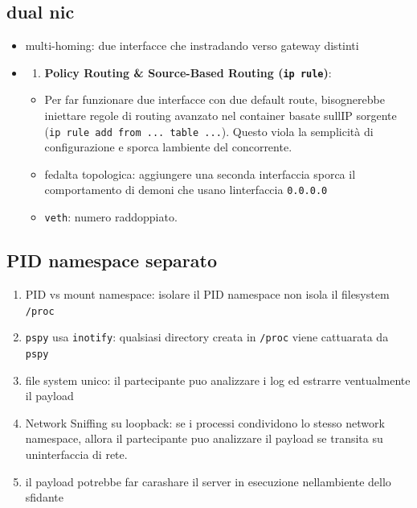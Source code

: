 \subsection{dual nic}\label{dual-nic}

\begin{itemize}
\item
  multi-homing: due interfacce che instradando verso gateway distinti
\item
  \begin{enumerate}
  \def\labelenumi{\arabic{enumi}.}
  \setcounter{enumi}{2}
  \tightlist
  \item
    \textbf{Policy Routing \& Source-Based Routing
    (\passthrough{\lstinline!ip rule!})}:
  \end{enumerate}

  \begin{itemize}
  \tightlist
  \item
    Per far funzionare due interfacce con due default route,
    bisognerebbe iniettare regole di routing avanzato nel container
    basate sull\textquotesingle IP sorgente
    (\passthrough{\lstinline!ip rule add from ... table ...!}). Questo
    viola la semplicità di configurazione e sporca
    l\textquotesingle ambiente del concorrente.
  \item
    fedalta topologica: aggiungere una seconda interfaccia sporca il
    comportamento di demoni che usano l\textquotesingle interfaccia
    \passthrough{\lstinline!0.0.0.0!}
  \item
    \passthrough{\lstinline!veth!}: numero raddoppiato.
  \end{itemize}
\end{itemize}

\subsection{PID namespace separato}\label{pid-namespace-separato}

\begin{enumerate}
\def\labelenumi{\arabic{enumi}.}
\tightlist
\item
  PID vs mount namespace: isolare il PID namespace non isola il
  filesystem \passthrough{\lstinline!/proc!}
\item
  \passthrough{\lstinline!pspy!} usa \passthrough{\lstinline!inotify!}:
  qualsiasi directory creata in \passthrough{\lstinline!/proc!} viene
  cattuarata da \passthrough{\lstinline!pspy!}
\item
  file system unico: il partecipante puo analizzare i log ed estrarre
  ventualmente il payload
\item
  Network Sniffing su loopback: se i processi condividono lo stesso
  network namespace, allora il partecipante puo\textquotesingle{}
  analizzare il payload se transita su un\textquotesingle interfaccia di
  rete.
\item
  il payload potrebbe far carashare il server in esecuzione
  nell\textquotesingle ambiente dello sfidante
\end{enumerate}

